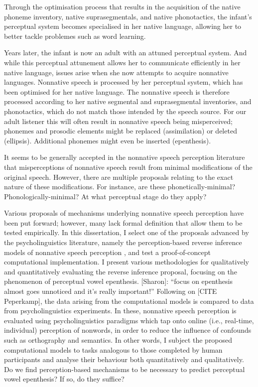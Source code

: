 Through the optimisation process that results in the acquisition of the native phoneme inventory, native suprasegmentals, and native phonotactics, the infant's perceptual system becomes specialised in her native language, allowing her to better tackle problemes such as word learning.  

Years later, the infant is now an adult with an attuned perceptual system. 
And while this perceptual attunement allows her to communicate efficiently in her native language, issues arise when she now attempts to acquire nonnative languages.
Nonnative speech is processed by her perceptual system, which has been optimised for her native language. The nonnative speech is therefore processed according to her native segmental and suprasegmental inventories, and phonotactics, which do not match those intended by the speech source. 
For our adult listener this will often result in nonnative speech being misperceived; phonemes and prosodic elements might be replaced (assimilation) or deleted (ellipsis). Additional phonemes might even be inserted (epenthesis).

It seems to be generally accepted in the nonnative speech perception literature that misperceptions of nonnative speech result from minimal modifications of the original speech. However, there are multiple proposals relating to the exact nature of these modifications. For instance, are these phonetically-minimal? Phonologically-minimal? At what perceptual stage do they apply? 

Various proposals of mechanisms underlying nonnative speech perception have been put forward; however, many lack formal definition that allow them to be tested empirically.  
In this dissertation, I select one of the proposals advanced by the psycholinguistics literature, namely the perception-based reverse inference models of nonnative speech perception \cite{dupoux2011, wilson2013}, and test a proof-of-concept computational implementation. 
I present various methodologies for qualitatively and quantitatively evaluating the reverse inference proposal, focusing on the phenomenon of perceptual vowel epenthesis.
{\color{red}[Sharon]: ``focus on epenthesis almost goes unnoticed and it's really important!''}
Following on [CITE Peperkamp], the data arising from the computational models is compared to data from psycholinguistics experiments. In these, nonnative speech perception is evaluated using psycholinguistics paradigms which tap onto online (i.e., real-time, individual) perception of nonwords, in order to reduce the influence of confounds such as orthography and semantics.
In other words, I subject the proposed computational models to tasks analogous to those completed by human participants and analyse their behaviour both quantitatively and qualitatively. Do we find perception-based mechanisms to be necessary to predict perceptual vowel epenthesis? If so, do they suffice? 


